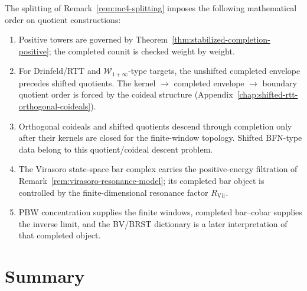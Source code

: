 \begin{remark}
\label{rem:mc4-coideal-descent}
The splitting of Remark~\ref{rem:mc4-splitting} imposes the following
mathematical order on quotient constructions:
\begin{enumerate}
\item Positive towers are governed by
 Theorem~\ref{thm:stabilized-completion-positive}; the completed
 counit is checked weight by weight.
\item For Drinfeld/RTT and $\mathcal{W}_{1+\infty}$-type targets, the
 unshifted completed envelope precedes shifted quotients.  The
 kernel $\to$ completed envelope $\to$ boundary quotient order is
 forced by the coideal structure
 \textup{(}Appendix~\textup{\ref{chap:shifted-rtt-orthogonal-coideals}}\textup{)}.
\item Orthogonal coideals and shifted quotients descend through
 completion only after their kernels are closed for the
 finite-window topology.  Shifted BFN-type data belong to this
 quotient/coideal descent problem.
\item The Virasoro state-space bar complex carries the
 positive-energy filtration of
 Remark~\ref{rem:virasoro-resonance-model}; its completed bar object
 is controlled by the finite-dimensional resonance factor
 $R_{\mathrm{Vir}}$.
\item PBW concentration supplies the finite windows, completed
 bar--cobar supplies the inverse limit, and the BV/BRST dictionary is a
 later interpretation of that completed object.
\end{enumerate}
\end{remark}

\section{Summary}

